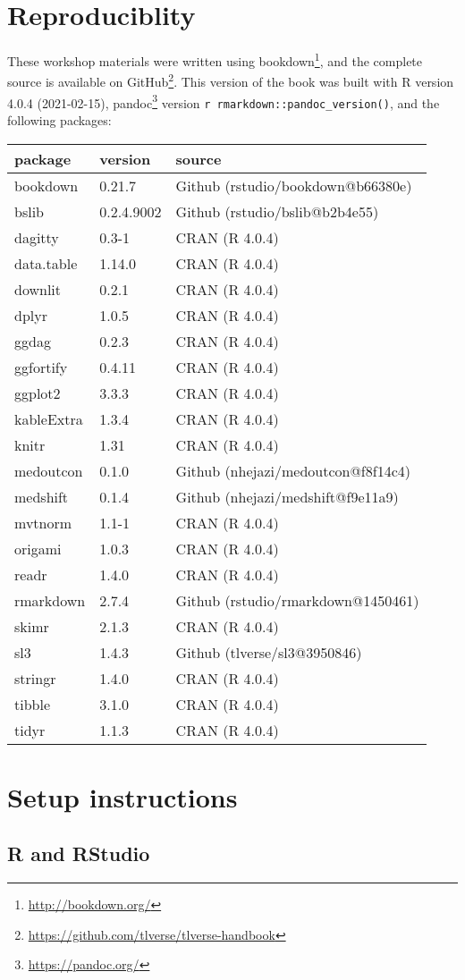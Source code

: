 \documentclass[
  12pt, krantz2,
]{book}
\renewcommand{\href}[2]{#2\footnote{\url{#1}}}
\theoremstyle{definition}
\theoremstyle{definition}
\theoremstyle{definition}
\newcommand{\1}{\mathbbm{1}}
\begin{document}
\hypertarget{repro}{%
\section{Reproduciblity}\label{repro}}

These workshop materials were written using \href{http://bookdown.org/}{bookdown},
and the complete source is available on
\href{https://github.com/tlverse/tlverse-handbook}{GitHub}. This version of the book
was built with R version 4.0.4 (2021-02-15), \href{https://pandoc.org/}{pandoc} version \texttt{r\ rmarkdown::pandoc\_version()}, and the following packages:

\begin{longtable}[]{@{}lll@{}}
\toprule
package & version & source\tabularnewline
\midrule
\endhead
bookdown & 0.21.7 & Github (rstudio/bookdown@b66380e)\tabularnewline
bslib & 0.2.4.9002 & Github (rstudio/bslib@b2b4e55)\tabularnewline
dagitty & 0.3-1 & CRAN (R 4.0.4)\tabularnewline
data.table & 1.14.0 & CRAN (R 4.0.4)\tabularnewline
downlit & 0.2.1 & CRAN (R 4.0.4)\tabularnewline
dplyr & 1.0.5 & CRAN (R 4.0.4)\tabularnewline
ggdag & 0.2.3 & CRAN (R 4.0.4)\tabularnewline
ggfortify & 0.4.11 & CRAN (R 4.0.4)\tabularnewline
ggplot2 & 3.3.3 & CRAN (R 4.0.4)\tabularnewline
kableExtra & 1.3.4 & CRAN (R 4.0.4)\tabularnewline
knitr & 1.31 & CRAN (R 4.0.4)\tabularnewline
medoutcon & 0.1.0 & Github (nhejazi/medoutcon@f8f14c4)\tabularnewline
medshift & 0.1.4 & Github (nhejazi/medshift@f9e11a9)\tabularnewline
mvtnorm & 1.1-1 & CRAN (R 4.0.4)\tabularnewline
origami & 1.0.3 & CRAN (R 4.0.4)\tabularnewline
readr & 1.4.0 & CRAN (R 4.0.4)\tabularnewline
rmarkdown & 2.7.4 & Github (rstudio/rmarkdown@1450461)\tabularnewline
skimr & 2.1.3 & CRAN (R 4.0.4)\tabularnewline
sl3 & 1.4.3 & Github (tlverse/sl3@3950846)\tabularnewline
stringr & 1.4.0 & CRAN (R 4.0.4)\tabularnewline
tibble & 3.1.0 & CRAN (R 4.0.4)\tabularnewline
tidyr & 1.1.3 & CRAN (R 4.0.4)\tabularnewline
\bottomrule
\end{longtable}

\hypertarget{setup}{%
\section{Setup instructions}\label{setup}}

\hypertarget{r-and-rstudio}{%
\subsection{R and RStudio}\label{r-and-rstudio}}
\end{document}
